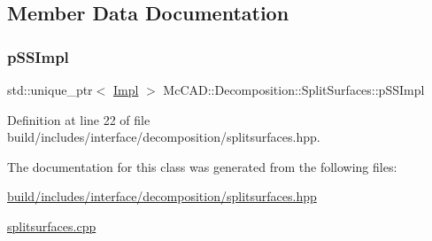 \subsection{Member Data Documentation}
\mbox{\label{classMcCAD_1_1Decomposition_1_1SplitSurfaces_a0cc9726e3748cbdcaa63533baca3959d}} 
\subsubsection{\texorpdfstring{p\+S\+S\+Impl}{pSSImpl}}
{\footnotesize\ttfamily std\+::unique\+\_\+ptr$<$ \hyperlink{classMcCAD_1_1Decomposition_1_1SplitSurfaces_1_1Impl}{Impl} $>$ Mc\+C\+A\+D\+::\+Decomposition\+::\+Split\+Surfaces\+::p\+S\+S\+Impl\hspace{0.3cm}{\ttfamily [private]}}



Definition at line 22 of file build/includes/interface/decomposition/splitsurfaces.\+hpp.



The documentation for this class was generated from the following files\+:\begin{DoxyCompactItemize}
\item 
\hyperlink{build_2includes_2interface_2decomposition_2splitsurfaces_8hpp}{build/includes/interface/decomposition/splitsurfaces.\+hpp}\item 
\hyperlink{splitsurfaces_8cpp}{splitsurfaces.\+cpp}\end{DoxyCompactItemize}

